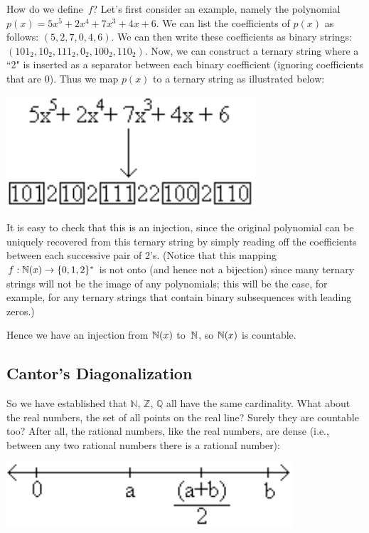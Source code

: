 \documentclass[11pt,fleqn]{article}
\begin{document}
How do we define~$f$?  Let's first consider an example, namely the polynomial
$p(x) = 5x^5 + 2x^4 + 7x^3 + 4x + 6$.
We can list the coefficients of $p(x)$ as follows: $(5,2,7,0,4,6)$.
We can then write these coefficients as binary strings: $(101_2,10_2,111_2,0_2,100_2,110_2)$.
Now, we can construct a ternary string where a ``2" is inserted as a separator
between each binary coefficient (ignoring coefficients that are 0).
Thus we map $p(x)$ to a ternary string as illustrated below:

\includegraphics[bb = -90 0 0 80, scale = 0.7]{polynat}

It is easy to check that this is an injection, since the original polynomial can be uniquely
recovered from this ternary string by simply reading off the coefficients between each
successive pair of 2's.
(Notice that this mapping $f:\mathbb{N}(x)\to\{0,1,2\}^*$ is not onto (and
hence not a bijection) since many ternary strings will not be the image of any polynomials;
this will be the case, for example, for any ternary strings that contain binary subsequences
with leading zeros.)

Hence we have an injection from $\mathbb{N}(x)$ to~$\mathbb{N}$, so $\mathbb{N}(x)$ is countable.

\subsection*{Cantor's Diagonalization}

So we have established that $\mathbb{N}$, $\mathbb{Z}$, $\mathbb{Q}$
all have the same cardinality. What about the real numbers,
the set of all points on the real line? Surely they are countable too?
After all, the rational numbers, like the real numbers, are dense (i.e.,
between any two rational numbers there is a rational number):

\includegraphics[bb = -100 0 0 50, scale = 0.7]{rationals}
\end{document}
